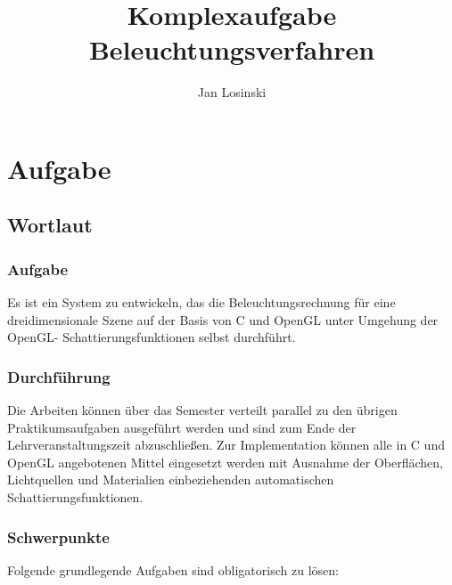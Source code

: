 \documentclass[final,a4paper,11pt,notitlepage,halfparskip]{scrreprt}
\title{Komplexaufgabe\\
Beleuchtungsverfahren}
\author{Jan Losinski}
\begin{document}
\maketitle

\tableofcontents

\chapter{Aufgabe}
\section{Wortlaut}
\subsection{Aufgabe}
Es ist ein System zu entwickeln, das die Beleuchtungsrechnung für eine dreidimensionale
Szene auf der Basis von C und OpenGL unter Umgehung der OpenGL-
Schattierungsfunktionen selbst durchführt.

\subsection{Durchführung}
Die Arbeiten können über das Semester verteilt parallel zu den übrigen Praktikumsaufgaben
ausgeführt werden und sind zum Ende der Lehrveranstaltungszeit abzuschließen. Zur
Implementation können alle in C und OpenGL angebotenen Mittel eingesetzt werden mit
Ausnahme der Oberflächen, Lichtquellen und Materialien einbeziehenden automatischen
Schattierungsfunktionen.

\subsection{Schwerpunkte}
Folgende grundlegende Aufgaben sind obligatorisch zu lösen:
\end{document}
